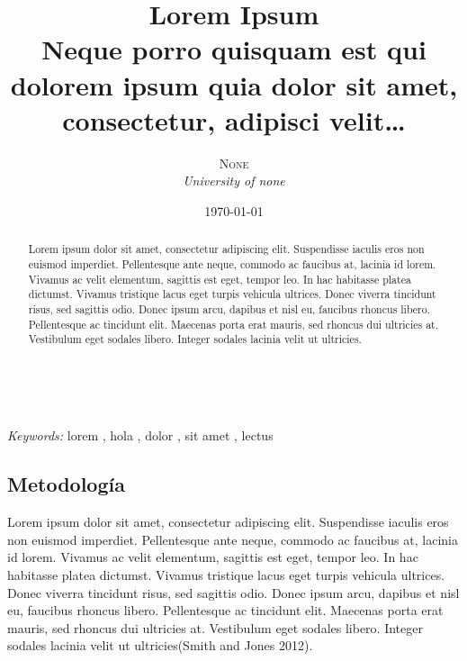 \documentclass[11pt]{article} %
\title{\textbf{Lorem Ipsum}\\ %
Neque porro quisquam est qui dolorem ipsum quia dolor sit amet,
consectetur, adipisci velit\ldots{}} %
\author{\textsc{None} %
\\{\textit{University of none}}
} %
\date{\today} %
\makeatletter
\renewcommand{\maketitle}{ %
\begin{flushright} %
{\LARGE\@title} %

\vspace{50pt} %

{\large\@author} %
\\\@date %

\vspace{40pt} %
\end{flushright}
}
\makeatother
\begin{document}
\maketitle %



\begin{abstract}
Lorem ipsum dolor sit amet, consectetur adipiscing elit. Suspendisse
iaculis eros non euismod imperdiet. Pellentesque ante neque, commodo ac
faucibus at, lacinia id lorem. Vivamus ac velit elementum, sagittis est
eget, tempor leo. In hac habitasse platea dictumst. Vivamus tristique
lacus eget turpis vehicula ultrices. Donec viverra tincidunt risus, sed
sagittis odio. Donec ipsum arcu, dapibus et nisl eu, faucibus rhoncus
libero. Pellentesque ac tincidunt elit. Maecenas porta erat mauris, sed
rhoncus dui ultricies at. Vestibulum eget sodales libero. Integer
sodales lacinia velit ut ultricies.
\end{abstract}

\hspace*{3,6mm}\textit{Keywords:} lorem , hola , dolor , sit amet , lectus %

\vspace{30pt} %


\subsection{Metodología}\label{metodologuxeda}

Lorem ipsum dolor sit amet, consectetur adipiscing elit. Suspendisse
iaculis eros non euismod imperdiet. Pellentesque ante neque, commodo ac
faucibus at, lacinia id lorem. Vivamus ac velit elementum, sagittis est
eget, tempor leo. In hac habitasse platea dictumst. Vivamus tristique
lacus eget turpis vehicula ultrices. Donec viverra tincidunt risus, sed
sagittis odio. Donec ipsum arcu, dapibus et nisl eu, faucibus rhoncus
libero. Pellentesque ac tincidunt elit. Maecenas porta erat mauris, sed
rhoncus dui ultricies at. Vestibulum eget sodales libero. Integer
sodales lacinia velit ut ultricies(Smith and Jones 2012).
\end{document}
